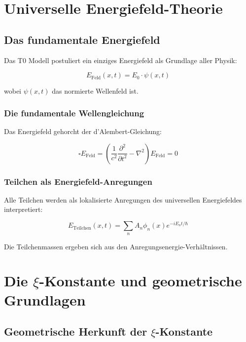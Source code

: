 \documentclass[12pt,a4paper]{report}
\begin{document}
	\chapter{Universelle Energiefeld-Theorie}
	
	\section{Das fundamentale Energiefeld}
	
	Das T0 Modell postuliert ein einziges Energiefeld als Grundlage aller Physik:
	
	\begin{equation}
		E_{\text{Feld}}(x,t) = E_0 \cdot \psi(x,t)
	\end{equation}
	
	wobei $\psi(x,t)$ das normierte Wellenfeld ist.
	
	\subsection{Die fundamentale Wellengleichung}
	
	Das Energiefeld gehorcht der d'Alembert-Gleichung:
	
	\begin{equation}
		\square E_{\text{Feld}} = \left(\frac{1}{c^2}\frac{\partial^2}{\partial t^2} - \nabla^2\right) E_{\text{Feld}} = 0
	\end{equation}
	
	\subsection{Teilchen als Energiefeld-Anregungen}
	
	Alle Teilchen werden als lokalisierte Anregungen des universellen Energiefeldes interpretiert:
	
	\begin{equation}
		E_{\text{Teilchen}}(x,t) = \sum_n A_n \phi_n(x) e^{-iE_n t/\hbar}
	\end{equation}
	
	Die Teilchenmassen ergeben sich aus den Anregungsenergie-Verhältnissen.
	
	\chapter{Die $\xi$-Konstante und geometrische Grundlagen}
	
	\section{Geometrische Herkunft der $\xi$-Konstante}
	
\end{document}
